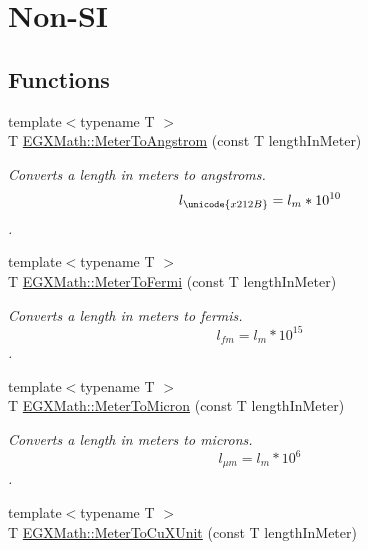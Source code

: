 \hypertarget{group___e_g_x_math-_conversions-_length_conversions-_s_i-_meter-_non-_s_i}{}\section{Non-\/\+SI}
\label{group___e_g_x_math-_conversions-_length_conversions-_s_i-_meter-_non-_s_i}
\subsection*{Functions}
\begin{DoxyCompactItemize}
\item 
{\footnotesize template$<$typename T $>$ }\\T \mbox{\hyperlink{group___e_g_x_math-_conversions-_length_conversions-_s_i-_meter-_non-_s_i_ga9e6d5040f58d167bd7a4b6cebb5527ee}{E\+G\+X\+Math\+::\+Meter\+To\+Angstrom}} (const T length\+In\+Meter)
\begin{DoxyCompactList}\small\item\em Converts a length in meters to angstroms. \[ l_{\unicode{x212B}}=l_{m} * 10^{10} \]. \end{DoxyCompactList}\item 
{\footnotesize template$<$typename T $>$ }\\T \mbox{\hyperlink{group___e_g_x_math-_conversions-_length_conversions-_s_i-_meter-_non-_s_i_ga2cf89a4a80da02e3e3c82e844095acfe}{E\+G\+X\+Math\+::\+Meter\+To\+Fermi}} (const T length\+In\+Meter)
\begin{DoxyCompactList}\small\item\em Converts a length in meters to fermis. \[ l_{fm}=l_{m} * 10^{15} \]. \end{DoxyCompactList}\item 
{\footnotesize template$<$typename T $>$ }\\T \mbox{\hyperlink{group___e_g_x_math-_conversions-_length_conversions-_s_i-_meter-_non-_s_i_ga9655833d43ede59b17c54a6f06f9681a}{E\+G\+X\+Math\+::\+Meter\+To\+Micron}} (const T length\+In\+Meter)
\begin{DoxyCompactList}\small\item\em Converts a length in meters to microns. \[ l_{\mu m}=l_{m} * 10^{6} \]. \end{DoxyCompactList}\item 
{\footnotesize template$<$typename T $>$ }\\T \mbox{\hyperlink{group___e_g_x_math-_conversions-_length_conversions-_s_i-_meter-_non-_s_i_ga67cec26b74704753fc51a8f4db27a4b4}{E\+G\+X\+Math\+::\+Meter\+To\+Cu\+X\+Unit}} (const T length\+In\+Meter)

\end{DoxyCompactItemize}
